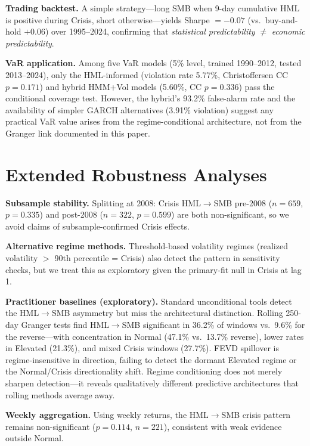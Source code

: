 \documentclass[sigconf,anonymous]{acmart}
\begin{document}
\textbf{Trading backtest.}
A simple strategy---long SMB when 9-day cumulative HML is positive during
Crisis, short otherwise---yields Sharpe $= -0.07$ (vs.\ buy-and-hold
$+0.06$) over 1995--2024, confirming that \emph{statistical predictability}
$\neq$ \emph{economic predictability}.

\textbf{VaR application.}
Among five VaR models (5\% level, trained 1990--2012, tested 2013--2024),
only the HML-informed (violation rate 5.77\%, Christoffersen CC $p = 0.171$)
and hybrid HMM+Vol models (5.60\%, CC $p = 0.336$) pass the conditional
coverage test. However, the hybrid's 93.2\% false-alarm rate and the
availability of simpler GARCH alternatives (3.91\% violation) suggest
any practical VaR value arises from the regime-conditional architecture,
not from the Granger link documented in this paper.

\section{Extended Robustness Analyses}
\label{app:robustness}

\textbf{Subsample stability.} Splitting at 2008: Crisis HML$\to$SMB
pre-2008 ($n = 659$, $p = 0.335$) and post-2008 ($n = 322$, $p = 0.599$)
are both non-significant, so we avoid claims of subsample-confirmed Crisis effects.

\textbf{Alternative regime methods.} Threshold-based volatility regimes
(realized volatility $>$ 90th percentile = Crisis) also detect the pattern
in sensitivity checks, but we treat this as exploratory given the primary-fit
null in Crisis at lag 1.

\textbf{Practitioner baselines (exploratory).} Standard unconditional tools detect the HML$\to$SMB
asymmetry but miss the architectural distinction. Rolling 250-day Granger tests
find HML$\to$SMB significant in 36.2\% of windows vs.\ 9.6\% for the
reverse---with concentration in Normal (47.1\% vs.\ 13.7\% reverse),
lower rates in Elevated (21.3\%), and mixed Crisis windows (27.7\%).
FEVD spillover is regime-insensitive in direction,
failing to detect the dormant Elevated regime or the Normal/Crisis directionality
shift. Regime conditioning does not merely sharpen detection---it reveals
qualitatively different predictive architectures that rolling methods average away.

\textbf{Weekly aggregation.} Using weekly returns, the HML$\to$SMB crisis pattern
remains non-significant ($p = 0.114$, $n = 221$), consistent with weak
evidence outside Normal.
\end{document}
